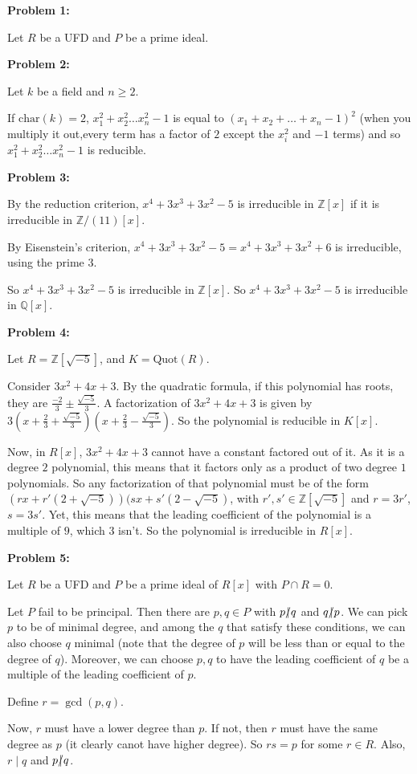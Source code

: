 \documentclass[a4paper,12pt]{article}
\newcommand{\shunt}{\vspace{20mm}}
\newcommand{\Q}{\mathbb{Q}}
\newcommand{\Z}{\mathbb{Z}}
\begin{document}
{\bf Problem 1:} 

Let $R$ be a UFD and $P$ be a prime ideal.

\shunt

{\bf Problem 2:} 

Let $k$ be a field and $n \geq 2$.

If $\text{char}(k) = 2$, $x_1^2 + x_2^2 \ldots x_n^2 -1$ is equal to $(x_1+x_2+\ldots+x_n-1)^2$ (when you multiply it out,every term has a factor of $2$ except the $x_i^2$ and $-1$ terms) and so $x_1^2 + x_2^2 \ldots x_n^2 -1$ is reducible.


\shunt

{\bf Problem 3:} 

By the reduction criterion, $x^4 + 3x^3 + 3x^2 -5$ is irreducible in $\Z[x]$ if it is irreducible in $\Z/(11)[x]$.

By Eisenstein's criterion, $x^4 + 3x^3 + 3x^2 -5 = x^4 + 3x^3 + 3x^2 +6$ is irreducible, using the prime $3$.

So $x^4 + 3x^3 + 3x^2 -5$ is irreducible in $\Z[x]$. So $x^4 + 3x^3 + 3x^2 -5$ is irreducible in $\Q[x]$.

\shunt

{\bf Problem 4:} 

Let $R = \Z[\sqrt{-5}]$, and $K = \text{Quot}(R)$. 

Consider $3x^2 + 4x + 3$. By the quadratic formula, if this polynomial has roots, they are $\frac{-2}{3} \pm \frac{\sqrt{-5}}{3}$. A factorization of $3x^2 + 4x + 3$ is given by $3(x+\frac{2}{3} + \frac{\sqrt{-5}}{3})(x+\frac{2}{3} - \frac{\sqrt{-5}}{3})$. So the polynomial is reducible in $K[x]$.

Now, in $R[x]$, $3x^2 + 4x + 3$ cannot have a constant factored out of it. As it is a degree $2$ polynomial, this means that it factors only as a product of two degree $1$ polynomials. So any factorization of that polynomial must be of the form $(rx+r'(2 +\sqrt{-5}))(sx+s'(2 -\sqrt{-5})$, with $r',s' \in \Z[\sqrt{-5}]$ and $r=3r'$, $s=3s'$. Yet, this means that the leading coefficient of the polynomial is a multiple of $9$, which $3$ isn't. So the polynomial is irreducible in $R[x]$.

\shunt

{\bf Problem 5:} 

Let $R$ be a UFD and $P$ be a prime ideal of $R[x]$ with $P \cap R = 0$.

Let $P$ fail to be principal. Then there are $p,q \in P$ with $p \slashed{\mid} q$ and $q \slashed{\mid} p$. We can pick $p$ to be of minimal degree, and among the $q$ that satisfy these conditions, we can also choose $q$ minimal (note that the degree of $p$ will be less than or equal to the degree of $q$). Moreover, we can choose $p,q$ to have the leading coefficient of $q$ be a multiple of the leading coefficient of $p$. 

Define $r = \gcd(p,q)$. 

Now, $r$ must have a lower degree than $p$. If not, then $r$ must have the same degree as $p$ (it clearly canot have higher degree). So $rs=p$ for some $r \in R$. Also, $r \mid q$ and $p \slashed{\mid} q$. %



\shunt
\end{document}
